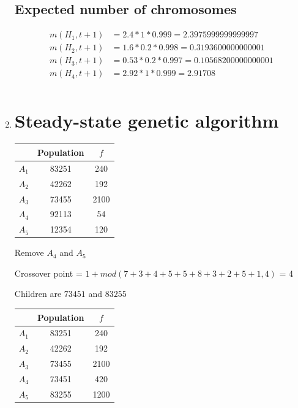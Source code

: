 \documentclass{article}
\begin{document}
\begin{enumerate}
        \subsection*{Expected number of chromosomes}
        \begin{align*}
            m(H_1,t +1) &= 2.4 * 1 * 0.999 = 2.3975999999999997\\
            m(H_2,t +1) &= 1.6 * 0.2 * 0.998 = 0.3193600000000001\\
            m(H_3,t +1) &= 0.53 * 0.2 * 0.997 = 0.10568200000000001\\
            m(H_4,t +1) &= 2.92 * 1 * 0.999 = 2.91708\\
        \end{align*}
    \item \section*{Steady-state genetic algorithm}
    \begin{table}[h]
        \centering
        \begin{tabular}{c|c|c}
            & Population & $f$ \\
            \hline
            $A_1$ & 83251 & 240 \\
            $A_2$ & 42262 & 192 \\
            $A_3$ & 73455 & 2100 \\
            $A_4$ & 92113 & 54 \\
            $A_5$ & 12354 & 120 \\
        \end{tabular}
    \end{table}

    Remove $A_4$ and $A_5$

    Crossover point = $1 + mod(7+3+4+5+5+8+3+2+5+1, 4)$ = 4

    Children are $73451$ and $83255$

    \begin{table}[h]
        \centering
        \begin{tabular}{c|c|c}
            & Population & $f$ \\
            \hline
            $A_1$ & 83251 & 240 \\
            $A_2$ & 42262 & 192 \\
            $A_3$ & 73455 & 2100 \\
            $A_4$ & 73451 & 420 \\
            $A_5$ & 83255 & 1200 \\
        \end{tabular}
    \end{table}


\end{enumerate}
\end{document}

